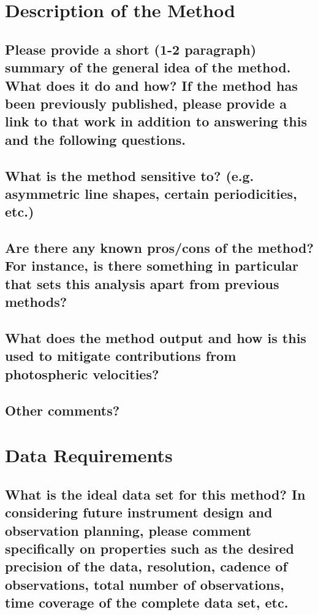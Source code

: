 \documentclass[12pt]{article}
\begin{document}
\section{Description of the Method}
\subsection{Please provide a short (1-2 paragraph) summary of the general idea of the method.  What does it do and how?  If the method has been previously published, please provide a link to that work in addition to answering this and the following questions.}


\subsection{What is the method sensitive to? (e.g. asymmetric line shapes, certain periodicities, etc.)}


\subsection{Are there any known pros/cons of the method?  For instance, is there something in particular that sets this analysis apart from previous methods?}


\subsection{What does the method output and how is this used to mitigate contributions from photospheric velocities?}


\subsection{Other comments?}



\section{Data Requirements}
\subsection{What is the ideal data set for this method?  In considering future instrument design and observation planning, please comment specifically on properties such as the desired precision of the data, resolution, cadence of observations, total number of observations, time coverage of the complete data set, etc.}
\end{document}
